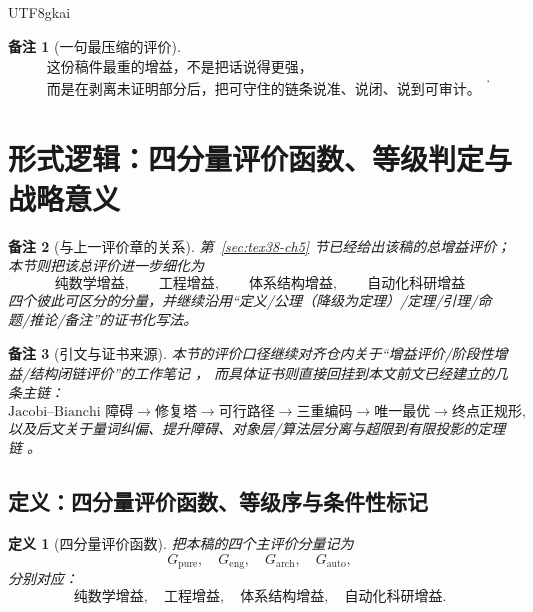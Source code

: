 \documentclass[12pt]{article}
\newtheorem{definition}{定义}[section]
\newtheorem{remark}{备注}[section]
\begin{document}
\begin{CJK*}{UTF8}{gkai}
\begin{remark}[一句最压缩的评价]
\[
  \boxed{
    \begin{aligned}
      &\text{这份稿件最重的增益，不是把话说得更强，}\\
      &\text{而是在剥离未证明部分后，把可守住的链条说准、说闭、说到可审计。}
    \end{aligned}
  }.
\]
\end{remark}

\clearpage

\section{形式逻辑：四分量评价函数、等级判定与战略意义}
\label{sec:tex38-ch6}

\begin{remark}[与上一评价章的关系]
第~\ref{sec:tex38-ch5} 节已经给出该稿的总增益评价；
本节则把该总评价进一步细化为
\[
  \text{纯数学增益},
  \qquad
  \text{工程增益},
  \qquad
  \text{体系结构增益},
  \qquad
  \text{自动化科研增益}
\]
四个彼此可区分的分量，并继续沿用“定义/公理（降级为定理）/定理/引理/命题/推论/备注”的证书化写法。
\end{remark}

\begin{remark}[引文与证书来源]
本节的评价口径继续对齐仓内关于“增益评价/阶段性增益/结构闭链评价”的工作笔记
\cite{RepoTex37GainEvaluation,RepoTex28StageGains,RepoTex22DiscussionGains}，
而具体证书则直接回挂到本文前文已经建立的几条主链：
\[
  \text{Jacobi--Bianchi 障碍}
  \to
  \text{修复塔}
  \to
  \text{可行路径}
  \to
  \text{三重编码}
  \to
  \text{唯一最优}
  \to
  \text{终点正规形},
\]
以及后文关于量词纠偏、提升障碍、对象层/算法层分离与超限到有限投影的定理链
\cite{RepoTex31RepairTower,RepoTex32ConditionalConvergence,RepoTex36HomotopyTwistBijection,RepoTex29TransfiniteRepair,
  RepoTex6JacobiGap,GaoZheng2025GFramework,GaoZhengAppVol3}。
\end{remark}

\subsection{定义：四分量评价函数、等级序与条件性标记}
\label{subsec:tex38-fourcomp-definition}

\begin{definition}[四分量评价函数]
\label{def:tex38-fourcomp}
把本稿的四个主评价分量记为
\[
  G_{\mathrm{pure}},\quad
  G_{\mathrm{eng}},\quad
  G_{\mathrm{arch}},\quad
  G_{\mathrm{auto}},
\]
分别对应：
\[
  \text{纯数学增益},\quad
  \text{工程增益},\quad
  \text{体系结构增益},\quad
  \text{自动化科研增益}.
\]


\end{definition}
\end{CJK*}
\end{document}
